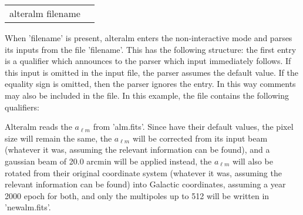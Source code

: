 \begin{examples}{2}
{
\begin{tabular}{ll} %
alteralm  filename \\
\end{tabular}
}
{When 'filename' is present, alteralm enters the non-interactive mode and parses
its inputs from the file 'filename'. This has the following
structure: the first entry is a qualifier which announces to the parser
which input immediately follows. If this input is omitted in the
input file, the parser assumes the default value.
If the equality sign is omitted, then the parser ignores the entry.
In this way comments may also be included in the file.
In this example, the file contains the following qualifiers:\hfill\newline
{}

Alteralm reads the $a_{\ell m}$ from 'alm.fits'. Since \hfill\newline
{}
have their default values, the pixel size will remain the same, the $a_{\ell m}$ will be corrected
from its input beam (whatever it was, assuming the relevant information can be
found), and a gaussian beam of 20.0 arcmin will be applied
instead, the $a_{\ell m}$ will also be rotated from their original coordinate system
(whatever it was, assuming the relevant information can be found)
into Galactic coordinates, assuming a year 2000 epoch for both,
 and only the multipoles up to 512 will be written in
'newalm.fits'.
}
\end{examples}


